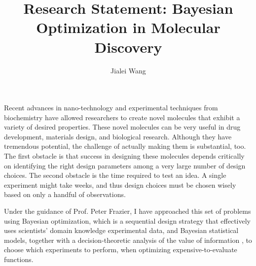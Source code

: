 \documentclass[11pt]{article}
\title{Research Statement: Bayesian Optimization in Molecular Discovery}
\author{Jialei Wang}
\affil{Operations Research \& Information Engineering, Cornell University}
\date{\vspace{-5ex}} %
\begin{document}
\maketitle

Recent advances in nano-technology and experimental techniques
from biochemistry have allowed researchers to create novel molecules that exhibit a variety of desired
properties. These novel molecules can 
be very useful in drug development, materials design, and biological research. Although they have
tremendous potential, the challenge of actually making them is substantial,
too. The first obstacle is that success in designing these molecules depends critically on identifying the
right design parameters among a very large number of design choices.
The second obstacle is the time required to
test an idea. A single experiment might take weeks, and thus design
choices must be chosen wisely based on only a handful of observations. 

Under the guidance of Prof. Peter Frazier, I have approached
this set of problems using Bayesian optimization, which is a sequential design strategy that effectively uses scientists' domain knowledge experimental data, and Bayesian statistical models, together with a decision-theoretic analysis of the value of information \citep{howard1966information}, to choose which experiments to perform, when optimizing expensive-to-evaluate functions.

\end{document}
